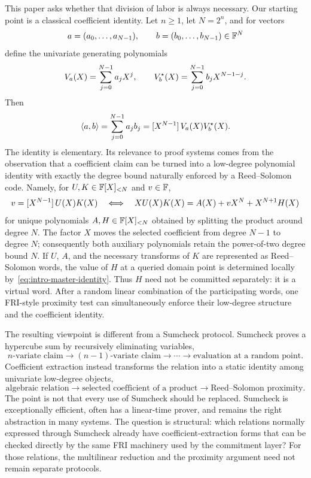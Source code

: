 This paper asks whether that division of labor is always necessary.  Our starting point is a classical coefficient identity.  Let $n\ge 1$, let $N=2^n$, and for vectors
\[
  a=(a_0,\ldots,a_{N-1}),\qquad
  b=(b_0,\ldots,b_{N-1})\in \mathbb{F}^N
\]
define the univariate generating polynomials
\[
  V_a(X)=\sum_{j=0}^{N-1}a_jX^j,
  \qquad
  V_b^{\star}(X)=\sum_{j=0}^{N-1}b_jX^{N-1-j}.
\]
Then
\begin{equation}
  \left\langle a,b\right\rangle
  =\sum_{j=0}^{N-1}a_jb_j
  =[X^{N-1}]\,V_a(X)V_b^{\star}(X).
  \label{eq:intro-ip-coeff}
\end{equation}
The identity is elementary.  Its relevance to proof systems comes from the observation that a coefficient claim can be turned into a low-degree polynomial identity with exactly the degree bound naturally enforced by a Reed--Solomon code.  Namely, for $U,K\in\mathbb{F}[X]_{<N}$ and $v\in\mathbb{F}$,
\begin{equation}
  v=[X^{N-1}]\,U(X)K(X)
  \quad\Longleftrightarrow\quad
  XU(X)K(X)=A(X)+vX^N+X^{N+1}H(X)
  \label{eq:intro-master-identity}
\end{equation}
for unique polynomials $A,H\in\mathbb{F}[X]_{<N}$ obtained by splitting the product around degree $N$.  The factor $X$ moves the selected coefficient from degree $N-1$ to degree $N$; consequently both auxiliary polynomials retain the power-of-two degree bound $N$.  If $U$, $A$, and the necessary transforms of $K$ are represented as Reed--Solomon words, the value of $H$ at a queried domain point is determined locally by~\eqref{eq:intro-master-identity}.  Thus $H$ need not be committed separately: it is a virtual word.  After a random linear combination of the participating words, one FRI-style proximity test can simultaneously enforce their low-degree structure and the coefficient identity.

The resulting viewpoint is different from a Sumcheck protocol.  Sumcheck proves a hypercube sum by recursively eliminating variables,
\[
  n\text{-variate claim}
  \longrightarrow
  (n-1)\text{-variate claim}
  \longrightarrow\cdots\longrightarrow
  \text{evaluation at a random point}.
\]
Coefficient extraction instead transforms the relation into a static identity among univariate low-degree objects,
\[
  \text{algebraic relation}
  \longrightarrow
  \text{selected coefficient of a product}
  \longrightarrow
  \text{Reed--Solomon proximity}.
\]
The point is not that every use of Sumcheck should be replaced.  Sumcheck is exceptionally efficient, often has a linear-time prover, and remains the right abstraction in many systems.  The question is structural: which relations normally expressed through Sumcheck already have coefficient-extraction forms that can be checked directly by the same FRI machinery used by the commitment layer?  For those relations, the multilinear reduction and the proximity argument need not remain separate protocols.

